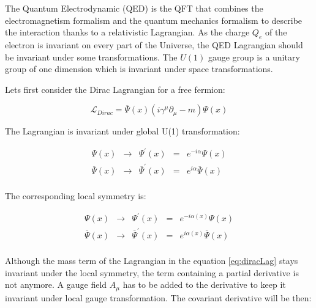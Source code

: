      The Quantum Electrodynamic (QED) is the QFT that combines the electromagnetism formalism and the quantum mechanics formalism to describe the interaction thanks to a relativistic Lagrangian.
     As the charge $Q_e$ of the electron is invariant on every part of the Universe, the QED Lagrangian should be invariant under some transformations.
     The $U(1)$ gauge group is a unitary group of one dimension which is invariant under space transformations.

      Lets first consider the Dirac Lagrangian for a free fermion:
      
      \begin{equation}
        \mathcal{L}_{Dirac} = \overline{\Psi}\left(x\right) \left(i \gamma^{\mu}\partial_{\mu} - m \right) \Psi\left(x\right)
        \label{eq:diracLag}
      \end{equation}

      The Lagrangian is invariant under global U(1) transformation:

      \begin{equation}
            \begin{array}{rrccr}
             \Psi \left(x \right) & \rightarrow & \Psi^{'} \left(x \right)  & = & e^{-i\alpha} \Psi\left(x\right) \\
             \overline{\Psi}\left(x\right) & \rightarrow & \overline{\Psi}^{'}\left(x\right) & = & e^{i\alpha}  \overline{\Psi}\left(x\right) \\
            \end{array}
      \end{equation}

      The corresponding local symmetry is:

      \begin{equation}
            \begin{array}{rcccr}
             \Psi\left(x\right) & \rightarrow & \Psi^{'} \left(x \right) & = & e^{-i\alpha(x)} \Psi\left(x\right) \\
             \overline{\Psi}\left(x\right) & \rightarrow & \overline{\Psi}^{'}\left(x\right) & = & e^{i\alpha(x)}  \overline{\Psi}\left(x\right) \\
            \end{array}
      \end{equation}

      Although the mass term of the Lagrangian in the equation \ref{eq:diracLag} stays invariant under the local symmetry, the term containing a partial derivative is not anymore.
      A gauge field $A_{\mu}$ has to be added to the derivative to keep it invariant under local gauge transformation.
      The covariant derivative will be then: 

